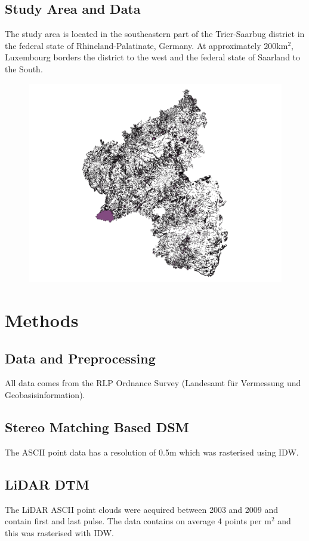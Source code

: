 \documentclass[authoryear, review,12pt,number]{elsarticle}
\begin{document}
\subsection{Study Area and Data}
The study area is located in the southeastern part of the Trier-Saarbug district
in the federal state of Rhineland-Palatinate, Germany. At approximately
200km$^{2}$, Luxembourg borders the district to the west and the federal state
of Saarland to the South.
\begin{figure}
	\includegraphics[width=\textwidth]{diagrams/study_area_small.png}
\end{figure}
\section{Methods}
\subsection{Data and Preprocessing}
All data comes from the RLP Ordnance Survey (Landesamt f\"ur Vermessung und
Geobasisinformation).
\subsection{Stereo Matching Based DSM}
The ASCII point data has a resolution of 0.5m which was rasterised using IDW.
\subsection{LiDAR DTM}
The LiDAR ASCII point clouds were acquired between 2003 and 2009 and contain
first and last pulse. The data contains on average 4 points per m$^{2}$ and
this was rasterised with IDW.
\end{document}

